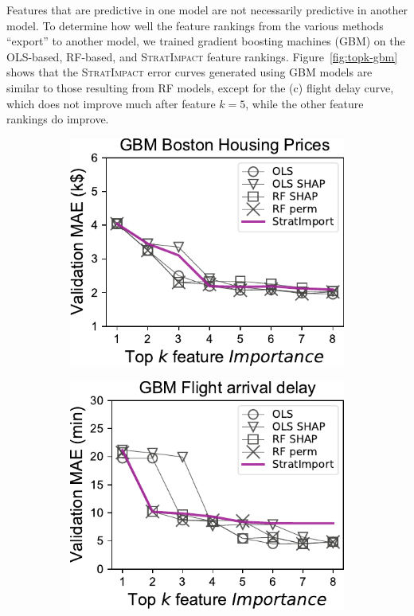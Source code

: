 \documentclass[11pt]{article}
\newcommand{\figref}[1]{Figure~\ref{#1}}
\newcommand{\simp}{\fontfamily{cmr}\textsc{\small StratImpact}}
\begin{document}
Features that are predictive in one model are not necessarily predictive in another model.  To determine how well the feature rankings from the various methods ``export'' to another model, we trained gradient boosting machines (GBM) on the OLS-based, RF-based, and \simp{} feature rankings.  \figref{fig:topk-gbm} shows that the \simp{} error curves generated using GBM models are similar to those resulting from RF models, except for the (c) flight delay curve, which does not improve much after feature $k=5$, while the other feature rankings do improve. 

\begin{figure}
\centering
\begin{subfigure}{.245\textwidth}
    \centering
\includegraphics[scale=0.45]{images/boston-topk-GBM-Importance.pdf}
\vspace{-7mm}
\subcaption{}
\end{subfigure}%
\hfill
\begin{subfigure}{.245\textwidth}
    \centering
\includegraphics[scale=0.45]{images/flights-topk-GBM-Importance.pdf}

\end{subfigure}
\end{figure}
\end{document}

